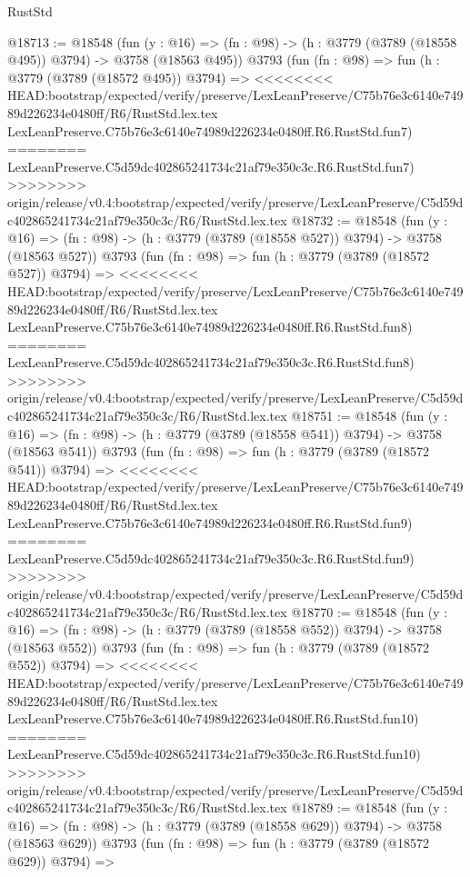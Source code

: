 \begin{lexlean}{RustStd}
\begin{coremodule}
{\begin{coremodule}
{{{{{{{{{{{{{{{{{{{{{{{{{{{{{{{@18713 := @18548
    (fun (y : @16) => (fn : @98) -> (h : @3779 (@3789 (@18558 @495)) @3794) -> @3758 (@18563 @495))
    @3793
    (fun (fn : @98) =>
    fun (h : @3779 (@3789 (@18572 @495)) @3794) =>
<<<<<<<< HEAD:bootstrap/expected/verify/preserve/LexLeanPreserve/C75b76e3c6140e74989d226234e0480ff/R6/RustStd.lex.tex
    LexLeanPreserve.C75b76e3c6140e74989d226234e0480ff.R6.RustStd.fun7)
========
    LexLeanPreserve.C5d59dc402865241734c21af79e350c3c.R6.RustStd.fun7)
>>>>>>>> origin/release/v0.4:bootstrap/expected/verify/preserve/LexLeanPreserve/C5d59dc402865241734c21af79e350c3c/R6/RustStd.lex.tex
@18732 := @18548
    (fun (y : @16) => (fn : @98) -> (h : @3779 (@3789 (@18558 @527)) @3794) -> @3758 (@18563 @527))
    @3793
    (fun (fn : @98) =>
    fun (h : @3779 (@3789 (@18572 @527)) @3794) =>
<<<<<<<< HEAD:bootstrap/expected/verify/preserve/LexLeanPreserve/C75b76e3c6140e74989d226234e0480ff/R6/RustStd.lex.tex
    LexLeanPreserve.C75b76e3c6140e74989d226234e0480ff.R6.RustStd.fun8)
========
    LexLeanPreserve.C5d59dc402865241734c21af79e350c3c.R6.RustStd.fun8)
>>>>>>>> origin/release/v0.4:bootstrap/expected/verify/preserve/LexLeanPreserve/C5d59dc402865241734c21af79e350c3c/R6/RustStd.lex.tex
@18751 := @18548
    (fun (y : @16) => (fn : @98) -> (h : @3779 (@3789 (@18558 @541)) @3794) -> @3758 (@18563 @541))
    @3793
    (fun (fn : @98) =>
    fun (h : @3779 (@3789 (@18572 @541)) @3794) =>
<<<<<<<< HEAD:bootstrap/expected/verify/preserve/LexLeanPreserve/C75b76e3c6140e74989d226234e0480ff/R6/RustStd.lex.tex
    LexLeanPreserve.C75b76e3c6140e74989d226234e0480ff.R6.RustStd.fun9)
========
    LexLeanPreserve.C5d59dc402865241734c21af79e350c3c.R6.RustStd.fun9)
>>>>>>>> origin/release/v0.4:bootstrap/expected/verify/preserve/LexLeanPreserve/C5d59dc402865241734c21af79e350c3c/R6/RustStd.lex.tex
@18770 := @18548
    (fun (y : @16) => (fn : @98) -> (h : @3779 (@3789 (@18558 @552)) @3794) -> @3758 (@18563 @552))
    @3793
    (fun (fn : @98) =>
    fun (h : @3779 (@3789 (@18572 @552)) @3794) =>
<<<<<<<< HEAD:bootstrap/expected/verify/preserve/LexLeanPreserve/C75b76e3c6140e74989d226234e0480ff/R6/RustStd.lex.tex
    LexLeanPreserve.C75b76e3c6140e74989d226234e0480ff.R6.RustStd.fun10)
========
    LexLeanPreserve.C5d59dc402865241734c21af79e350c3c.R6.RustStd.fun10)
>>>>>>>> origin/release/v0.4:bootstrap/expected/verify/preserve/LexLeanPreserve/C5d59dc402865241734c21af79e350c3c/R6/RustStd.lex.tex
@18789 := @18548
    (fun (y : @16) => (fn : @98) -> (h : @3779 (@3789 (@18558 @629)) @3794) -> @3758 (@18563 @629))
    @3793
    (fun (fn : @98) =>
    fun (h : @3779 (@3789 (@18572 @629)) @3794) =>
}}}}}}}}}}}}}}}}}}}}}}}}}}}}}}}
\end{coremodule}}
\end{coremodule}
\end{lexlean}
